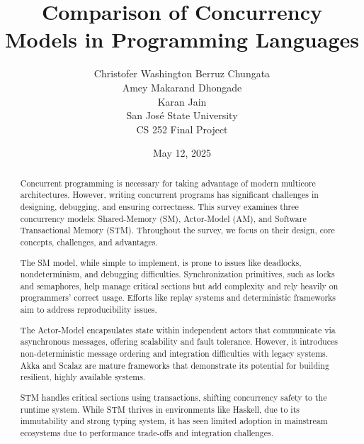 \documentclass[12pt]{article}
\begin{document}
\title{Comparison of Concurrency Models in Programming Languages}
\author{
    Christofer Washington Berruz Chungata \\ 
    Amey Makarand Dhongade \\ 
    Karan Jain \\ 
    San Jos\'{e} State University \\ 
    CS 252 Final Project
}
\date{May 12, 2025}

\maketitle

\begin{abstract}
Concurrent programming is necessary for taking advantage of modern multicore architectures.
However, writing concurrent programs has significant challenges in designing, debugging, and ensuring correctness.
This survey examines three concurrency models: Shared-Memory (SM), Actor-Model (AM), and Software Transactional Memory (STM).
Throughout the survey, we focus on their design, core concepts, challenges, and advantages.

The SM model, while simple to implement, is prone to issues like deadlocks, nondeterminism, and debugging difficulties.
Synchronization primitives, such as locks and semaphores, help manage critical sections but add complexity and rely heavily on programmers' correct usage.
Efforts like replay systems and deterministic frameworks aim to address reproducibility issues.

The Actor-Model encapsulates state within independent actors that communicate via asynchronous messages, offering scalability and fault tolerance.
However, it introduces non-deterministic message ordering and integration difficulties with legacy systems.
Akka and Scalaz are mature frameworks that demonstrate its potential for building resilient, highly available systems.

STM handles critical sections using transactions, shifting concurrency safety to the runtime system.
While STM thrives in environments like Haskell, due to its immutability and strong typing system, it has seen limited adoption in mainstream ecosystems due to performance trade-offs and integration challenges.
\end{abstract}










\end{document}
